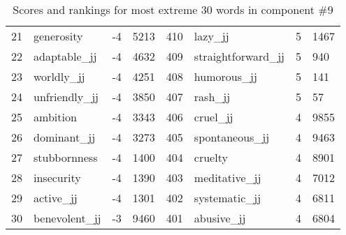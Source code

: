 \begin{table}[tbp]
\begin{tabular}{| rlr@{.}l | rlr@{.}l |}
    21 & generosity & -4 & 5213    &    410 & lazy\_jj & 5 & 1467 \\
    22 & adaptable\_jj & -4 & 4632    &    409 & straightforward\_jj & 5 & 940 \\
    23 & worldly\_jj & -4 & 4251    &    408 & humorous\_jj & 5 & 141 \\
    24 & unfriendly\_jj & -4 & 3850    &    407 & rash\_jj & 5 & 57 \\
    25 & ambition & -4 & 3343    &    406 & cruel\_jj & 4 & 9855 \\
    26 & dominant\_jj & -4 & 3273    &    405 & spontaneous\_jj & 4 & 9463 \\
    27 & stubbornness & -4 & 1400    &    404 & cruelty & 4 & 8901 \\
    28 & insecurity & -4 & 1390    &    403 & meditative\_jj & 4 & 7012 \\
    29 & active\_jj & -4 & 1301    &    402 & systematic\_jj & 4 & 6811 \\
    30 & benevolent\_jj & -3 & 9460    &    401 & abusive\_jj & 4 & 6804 \\
    \hline
    \end{tabular}
    \caption{Scores and rankings for most extreme 30 words in component \#9} 
\end{table}
\clearpage

